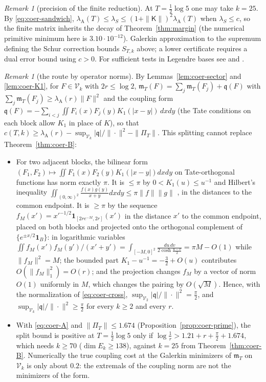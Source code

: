 \documentclass[11pt]{amsart}
\theoremstyle{definition}
\theoremstyle{remark}
\newtheorem{remark}[theorem]{Remark}
\newcommand{\lamA}{\lambda_{\mathrm A}(T)}
\newcommand{\PiT}{\Pi_T}
\newcommand{\mT}{\mathfrak m_T}
\begin{document}
\begin{remark}[precision of the finite reduction]\label{rem:coer-honest}
At $T=\tfrac12\log5$ one may take $k=25$. By \eqref{eq:coer-sandwich},
$\lamA\le\lambda_S\le(1+\|\mathsf K\|)^2\lamA$ when $\lambda_S\le c$,
so the finite matrix inherits the decay of Theorem~\ref{thm:margin}
(the numerical primitive minimum here is $3.10\cdot10^{-12}$).
Galerkin approximation to the supremum defining the Schur correction
bounds $S_{T,k}$ above; a lower certificate requires a dual error bound
using $c>0$. For sufficient tests in Legendre bases see
\cite[Thms.~1.1, 1.4]{Zhu2026} and \cite{Groskin2026}.
\end{remark}

\begin{remark}[the route by operator norms]\label{rem:coer-nogo}
By Lemmas~\ref{lem:coer-sector} and \ref{lem:coer-K1}, for $F\in\mathcal V_k$ with $2r\le\log2$,
$\mT(F)=\sum_j\mT(F_j)+\mathfrak q(F)$ with $\sum_j\mT(F_j)\ge\lambda_{\mathrm A}(r)\|F\|^2$ and the coupling form
$\mathfrak q(F)=-\sum_{i<j}\iint F_i(x)F_j(y)K_1(|x-y|)\,dxdy$ (the Tate conditions on each block allow $K_1$ in place of $K$),
so that $c(T,k)\ge\lambda_{\mathrm A}(r)-\sup_{\mathcal V_k}|\mathfrak q|/\|\cdot\|^2-\|\PiT\|$. This splitting cannot replace
Theorem~\ref{thm:coer-B}:
\begin{itemize}
\item[(a)] For two adjacent blocks, the bilinear form $(F_1,F_2)\mapsto\iint F_1(x)F_2(y)K_1(|x-y|)dxdy$ on Tate-orthogonal
functions has norm exactly $\pi$. It is $\le\pi$ by $0<K_1(u)\le u^{-1}$ and Hilbert's inequality
$\iint_{(0,\infty)^2}\frac{f(x)g(y)}{x+y}dxdy\le\pi\|f\|\|g\|$ \cite[Thm.~316]{HLP}, in the distances to the common endpoint. It is
$\ge\pi$ by the sequence $f_M(x')=x'^{-1/2}\mathbf 1_{[2re^{-M},2r]}(x')$ in the distance $x'$ to the common endpoint, placed on
both blocks and projected onto the orthogonal complement of $\{e^{\pm x/2}\mathbf 1_B\}$: in logarithmic variables
$\iint f_M(x')f_M(y')/(x'+y')=\int_{[-M,0]^2}\frac{du\,dv}{2\cosh\frac{u-v}2}=\pi M-O(1)$ while $\|f_M\|^2=M$; the bounded part
$K_1-u^{-1}=-\frac32+O(u)$ contributes $O(\|f_M\|_1^2)=O(r)$; and the projection changes $f_M$ by a vector of norm $O(1)$
uniformly in $M$, which changes the pairing by $O(\sqrt M)$. Hence, with the normalization of \eqref{eq:coer-cross},
$\sup_{\mathcal V_2}|\mathfrak q|/\|\cdot\|^2=\frac\pi2$, and $\sup_{\mathcal V_k}|\mathfrak q|/\|\cdot\|^2\ge\frac\pi2$ for every $k\ge2$ and every
$r$.
\item[(b)] With \eqref{eq:coer-A} and $\|\PiT\|\le1.674$ (Proposition~\ref{prop:coer-prime}), the split bound is positive at
$T=\frac12\log5$ only if $\log\frac1r>1.21+r+\frac\pi2+1.674$, which needs $k\ge70$ ($\dim E_k\ge138$), against $k=25$ from
Theorem~\ref{thm:coer-B}. Numerically the true coupling cost at the Galerkin minimizers of $\mT$ on $\mathcal V_k$ is only
about $0.2$: the extremals of the coupling norm are not the minimizers of the form.
\end{itemize}
\end{remark}
\end{document}

